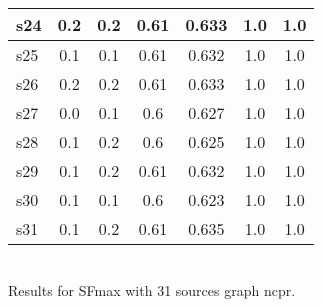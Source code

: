 \documentclass{article}
\begin{document}
\begin{tabular}{|l|c|c|c|c|c|c|}
\hline
s24 &0.2 & 0.2 & 0.61 & 0.633 & 1.0 & 1.0\\
\hline
s25 &0.1 & 0.1 & 0.61 & 0.632 & 1.0 & 1.0\\
\hline
s26 &0.2 & 0.2 & 0.61 & 0.633 & 1.0 & 1.0\\
\hline
s27 &0.0 & 0.1 & 0.6 & 0.627 & 1.0 & 1.0\\
\hline
s28 &0.1 & 0.2 & 0.6 & 0.625 & 1.0 & 1.0\\
\hline
s29 &0.1 & 0.2 & 0.61 & 0.632 & 1.0 & 1.0\\
\hline
s30 &0.1 & 0.1 & 0.6 & 0.623 & 1.0 & 1.0\\
\hline
s31 &0.1 & 0.2 & 0.61 & 0.635 & 1.0 & 1.0\\
\hline
\end{tabular}\\

\noindent Results for SFmax with 31 sources graph ncpr.
\end{document}
